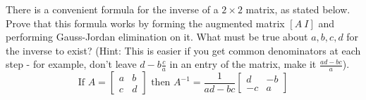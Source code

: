 	\question  There is a convenient formula for the inverse of a $2\times 2$ matrix, as stated below. Prove that this formula works by forming the augmented matrix $[A~I]$ and performing Gauss-Jordan elimination on it. What must be true about $a,b,c,d$ for the inverse to exist? (Hint: This is easier if you get common denominators at each step - for example, don't leave $d-b\frac{c}{a}$ in an entry of the matrix, make it $\frac{ad-bc}{a}$).
	\[ \text{If } A = \begin{bmatrix} a & b \\ c & d \end{bmatrix} \text{ then } A^{-1} = \frac{1}{ad - bc}\begin{bmatrix} d & -b \\ -c & a \end{bmatrix} \]
	
